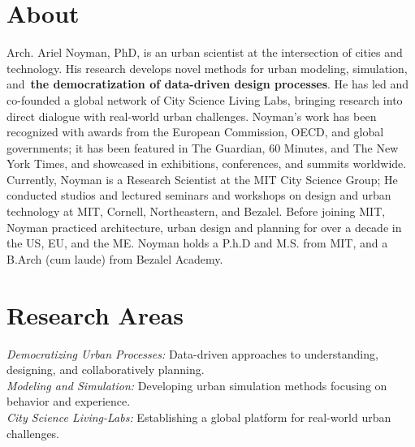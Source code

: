 \section*{About}

 {
  Arch. Ariel Noyman, PhD, is an urban scientist at the intersection of cities and technology. His research develops novel methods for urban modeling, simulation, and~\textbf{the democratization of data-driven design processes}. He has led and co-founded a global network of City Science Living Labs, bringing research into direct dialogue with real-world urban challenges. Noyman's work has been recognized with awards from the European Commission, OECD, and global governments; it has been featured in The Guardian, 60 Minutes, and The New York Times, and showcased in exhibitions, conferences, and summits worldwide. Currently, Noyman is a Research Scientist at the MIT City Science Group; He conducted studios and lectured seminars and workshops on design and urban technology at MIT, Cornell, Northeastern, and Bezalel. Before joining MIT, Noyman practiced architecture, urban design and planning for over a decade in the US, EU, and the ME. Noyman holds a P.h.D and M.S. from MIT, and a B.Arch (cum laude) from Bezalel Academy.
 }

\section*{Research Areas}
\textit{Democratizing Urban Processes:} Data-driven approaches to understanding, designing, and collaboratively planning.
\\
\textit{Modeling and Simulation:} Developing urban simulation methods focusing on behavior and experience.
\\
\textit{City Science Living-Labs:} Establishing a global platform for  real-world urban challenges.